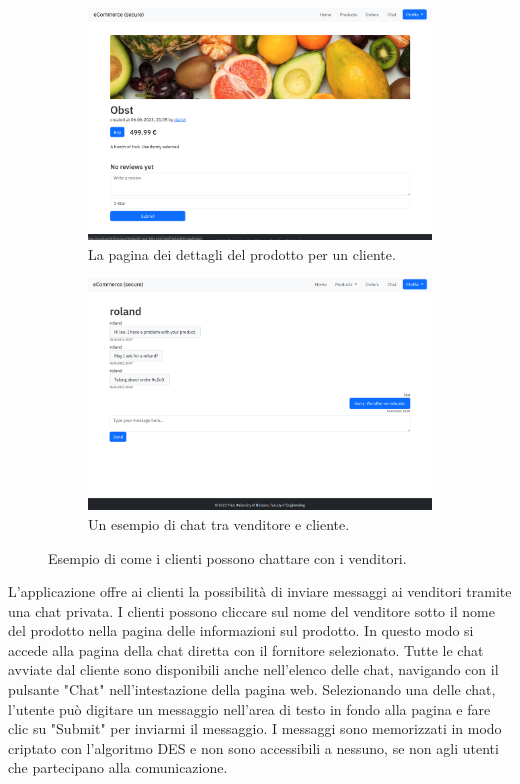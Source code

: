 \documentclass[conference,onecolumn,a4paper]{IEEEtran}
\begin{document}
\begin{figure}[H]
    \centering
    \begin{subfigure}[b]{0.4\linewidth}
        \includegraphics[width=\linewidth]{resources/product-customer.png}
        \caption{La pagina dei dettagli del prodotto per un cliente.}
    \end{subfigure}
    \begin{subfigure}[b]{0.4\linewidth}
        \includegraphics[width=\linewidth]{resources/chat.png}
        \caption{Un esempio di chat tra venditore e cliente.}
    \end{subfigure}
    \caption{Esempio di come i clienti possono chattare con i venditori.}
\end{figure}

L'applicazione offre ai clienti la possibilità di inviare messaggi ai venditori tramite una chat privata. I clienti possono cliccare sul nome del venditore sotto il nome del prodotto nella pagina delle informazioni sul prodotto. In questo modo si accede alla pagina della chat diretta con il fornitore selezionato. Tutte le chat avviate dal cliente sono disponibili anche nell'elenco delle chat, navigando con il pulsante "Chat" nell'intestazione della pagina web. Selezionando una delle chat, l'utente può digitare un messaggio nell'area di testo in fondo alla pagina e fare clic su "Submit" per inviarmi il messaggio. I messaggi sono memorizzati in modo criptato con l'algoritmo DES e non sono accessibili a nessuno, se non agli utenti che partecipano alla comunicazione.
\end{document}
